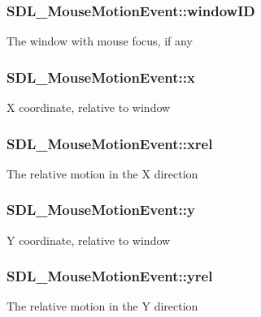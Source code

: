 \subsubsection[{window\+I\+D}]{ S\+D\+L\+\_\+\+Mouse\+Motion\+Event\+::window\+I\+D}\label{structSDL__MouseMotionEvent_aa9976725242ada93a9e18e7fdf5796e6}
The window with mouse focus, if any \hypertarget{structSDL__MouseMotionEvent_a36398bb4a5308446a262b0bfc8baa80a}{}
\subsubsection[{x}]{ S\+D\+L\+\_\+\+Mouse\+Motion\+Event\+::x}\label{structSDL__MouseMotionEvent_a36398bb4a5308446a262b0bfc8baa80a}
X coordinate, relative to window \hypertarget{structSDL__MouseMotionEvent_a1c01d9aba2a20778fb45a15dca39ef58}{}
\subsubsection[{xrel}]{ S\+D\+L\+\_\+\+Mouse\+Motion\+Event\+::xrel}\label{structSDL__MouseMotionEvent_a1c01d9aba2a20778fb45a15dca39ef58}
The relative motion in the X direction \hypertarget{structSDL__MouseMotionEvent_a7e6a7b1f8713d1968dc913908e8ea448}{}
\subsubsection[{y}]{ S\+D\+L\+\_\+\+Mouse\+Motion\+Event\+::y}\label{structSDL__MouseMotionEvent_a7e6a7b1f8713d1968dc913908e8ea448}
Y coordinate, relative to window \hypertarget{structSDL__MouseMotionEvent_a7674c8b92d039ab948f671a180fa7b30}{}
\subsubsection[{yrel}]{ S\+D\+L\+\_\+\+Mouse\+Motion\+Event\+::yrel}\label{structSDL__MouseMotionEvent_a7674c8b92d039ab948f671a180fa7b30}
The relative motion in the Y direction 

